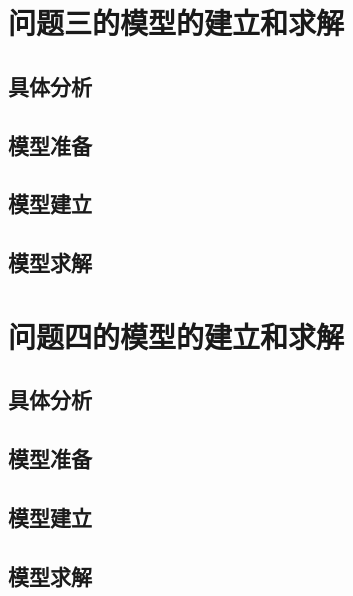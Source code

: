 \documentclass[withoutpreface,bwprint]{cumcmthesis}
\begin{document}
\newpage
\section{问题三的模型的建立和求解}
\subsection{具体分析}

\subsection{模型准备}

\subsection{模型建立}

\subsection{模型求解}
















\newpage
\section{问题四的模型的建立和求解}
\subsection{具体分析}

\subsection{模型准备}

\subsection{模型建立}

\subsection{模型求解}
\end{document}
